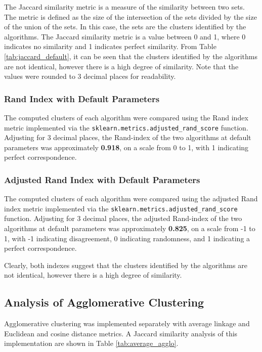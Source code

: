 \documentclass[12pt]{article}
\begin{document}
\vspace{-0.5cm}

The Jaccard similarity metric is a measure of the similarity between two sets. The metric is defined as the size of the intersection of the sets divided by the size of the union of the sets. In this case, the sets are the clusters identified by the algorithms. The Jaccard similarity metric is a value between 0 and 1, where 0 indicates no similarity and 1 indicates perfect similarity. From Table \ref{tab:jaccard_default}, it can be seen that the clusters identified by the algorithms are not identical, however there is a high degree of similarity. Note that the values were rounded to 3 decimal places for readability. 

\subsubsection{Rand Index with Default Parameters}
The computed clusters of each algorithm were compared using the Rand index metric implemented via the \verb|sklearn.metrics.adjusted_rand_score| function. Adjusting for 3 decimal places, the Rand-index of the two algorithms at default parameters was approximately \textbf{0.918}, on a scale from 0 to 1, with 1 indicating perfect correspondence.

\subsubsection{Adjusted Rand Index with Default Parameters}
The computed clusters of each algorithm were compared using the adjusted Rand index metric implemented via the \verb|sklearn.metrics.adjusted_rand_score| function. Adjusting for 3 decimal places, the adjusted Rand-index of the two algorithms at default parameters was approximately \textbf{0.825}, on a scale from -1 to 1, with -1 indicating disagreement, 0 indicating randomness, and 1 indicating a perfect correspondence.

Clearly, both indexes suggest that the clusters identified by the algorithms are not identical, however there is a high degree of similarity.

\subsection{Analysis of Agglomerative Clustering}
Agglomerative clustering was implemented separately with average linkage and Euclidean and cosine distance metrics. A Jaccard similarity analysis of this implementation are shown in Table \ref{tab:average_agglo}.
\end{document}
